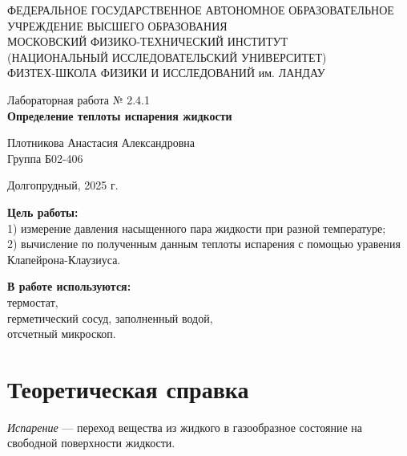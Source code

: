 \documentclass[a4paper,12pt]{article} %
\begin{document}
\begin{center}
	\footnotesize{ФЕДЕРАЛЬНОЕ ГОСУДАРСТВЕННОЕ АВТОНОМНОЕ ОБРАЗОВАТЕЛЬНОЕ 			УЧРЕЖДЕНИЕ ВЫСШЕГО ОБРАЗОВАНИЯ}\\
	\footnotesize{МОСКОВСКИЙ ФИЗИКО-ТЕХНИЧЕСКИЙ ИНСТИТУТ\\(НАЦИОНАЛЬНЫЙ 			ИССЛЕДОВАТЕЛЬСКИЙ УНИВЕРСИТЕТ)}\\
	\footnotesize{ФИЗТЕХ-ШКОЛА ФИЗИКИ И ИССЛЕДОВАНИЙ им. ЛАНДАУ\\}
	\hfill \break
	\hfill \break
	\hfill \break
	\hfill \break
\end{center}

\begin{center}   
    \hfill \break
	\hfill \break
	\hfill \break
	\hfill \break    \hfill \break
	\hfill \break
	\hfill \break
	\hfill \break
    \hfill \break
    \hfill \break
	\hfill \break
	\large{Лабораторная работа № 2.4.1\\\textbf{Определение теплоты испарения жидкости}}\\
	\begin{flushright}
		Плотникова Анастасия Александровна\\
		Группа Б02-406
	\end{flushright}
	\hfill \break
	\hfill \break
	\hfill \break
\end{center}
\hfill \break
\hfill \break
\hfill \break
\hfill \break
\hfill \break
\hfill \break
\hfill \break
\hfill \break
\hfill \break
\hfill \break
\hfill \break
\hfill \break
\hfill \break
\begin{center}
	Долгопрудный, 2025 г.
\end{center}
\thispagestyle{empty}
\newpage
	\textbf{Цель работы:}\\ 1) измерение давления насыщенного пара жидкости при разной температуре;\\ 2) вычисление по полученным данным теплоты испарения с помощью уравения Клапейрона-Клаузиуса.
	\hfill \break
	
	\textbf{В работе используются:}\\ термостат,\\ герметический сосуд, заполненный водой,\\ отсчетный микроскоп.
	
\section{Теоретическая справка}

\textit{Испарение} — переход вещества из жидкого в газообразное состояние 
на свободной поверхности жидкости. 
\end{document}
